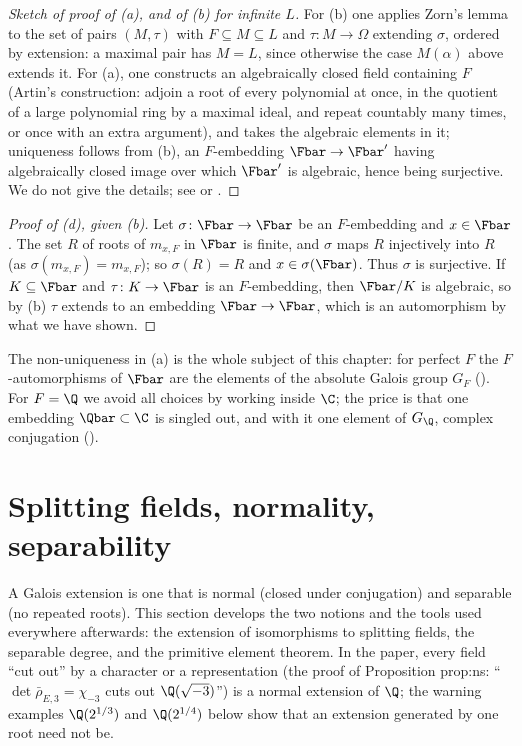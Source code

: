 \begin{proof}[Sketch of proof of (a), and of (b) for infinite $L$]
For (b) one applies Zorn's lemma to the set of pairs $(M,\tau)$ with $F\subseteq M\subseteq L$ and $\tau\colon M\to\Omega$
extending $\sigma$, ordered by extension: a maximal pair has $M=L$, since otherwise the case $M(\alpha)$ above extends it. For (a), one constructs an
algebraically closed field containing $F$ (Artin's construction: adjoin a root of every polynomial at once, in the quotient of a large polynomial ring by a
maximal ideal, and repeat countably many times, or once with an extra argument), and takes the algebraic elements in it; uniqueness follows from (b), an
$F$-embedding $\Fbar\to\Fbar'$ having algebraically closed image over which $\Fbar'$ is algebraic, hence being surjective. We do not give the details; see
\cite[Chapter V, Section 2]{Lang} or \cite[Section 13.4]{DummitFoote}.
\end{proof}

\begin{proof}[Proof of (d), given (b)]
Let $\sigma\colon\Fbar\to\Fbar$ be an $F$-embedding and $x\in\Fbar$. The set $R$ of roots of $m_{x,F}$ in $\Fbar$ is finite, and $\sigma$ maps $R$ injectively into $R$
(as $\sigma(m_{x,F})=m_{x,F}$); so $\sigma(R)=R$ and $x\in\sigma(\Fbar)$. Thus $\sigma$ is surjective. If $K\subseteq\Fbar$ and $\tau\colon K\to\Fbar$ is an $F$-embedding, then
$\Fbar/K$ is algebraic, so by (b) $\tau$ extends to an embedding $\Fbar\to\Fbar$, which is an automorphism by what we have shown.
\end{proof}

\begin{remark}\label{rem:galois:nonunique}
The non-uniqueness in (a) is the whole subject of this chapter: for perfect $F$ the $F$-automorphisms of $\Fbar$ are the elements of the absolute Galois
group $G_F$ (). For
$F=\Q$ we avoid all choices by working inside $\C$; the price is that one embedding $\Qbar\subset\C$ is singled out, and with it one element of $G_\Q$,
complex conjugation ().
\end{remark}

\section{Splitting fields, normality, separability}\label{sec:galois:splitting}

A Galois extension is one that is normal (closed under conjugation) and separable (no repeated roots). This section develops the two notions and the
tools used everywhere afterwards: the extension of isomorphisms to splitting fields, the separable degree, and the primitive element theorem. In the
paper, every field ``cut out'' by a character or a representation (the proof of Proposition prop:ns: ``$\det\bar\rho_{E,3}=\chi_{-3}$ cuts out $\Q(\sqrt{-3})$'') is a
normal extension of $\Q$; the warning examples $\Q(2^{1/3})$ and $\Q(2^{1/4})$ below show that an extension generated by one root need not be.

